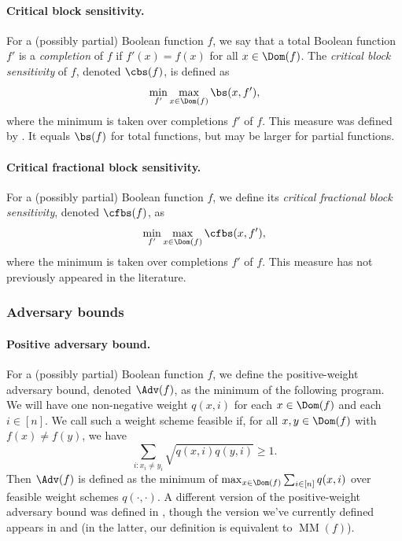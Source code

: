 \paragraph{Critical block sensitivity.}
For a (possibly partial) Boolean function $f$, we say that
a total Boolean function $f'$ is a \emph{completion} of $f$
if $f'(x)=f(x)$ for all $x\in\Dom(f)$. The \emph{critical block
sensitivity} of $f$, denoted $\cbs(f)$, is defined as
\[\min_{f'}\max_{x\in\Dom(f)}\bs(x,f'),\]
where the minimum is taken over completions $f'$ of $f$.
This measure was defined by \cite{HN12}. It equals $\bs(f)$
for total functions, but may be larger for partial functions.

\paragraph{Critical fractional block sensitivity.}
For a (possibly partial) Boolean function $f$, we define
its \emph{critical fractional block sensitivity}, denoted
$\cfbs(f)$, as
\[\min_{f'}\max_{x\in\Dom(f)}\cfbs(x,f'),\]
where the minimum is taken over completions $f'$ of $f$.
This measure has not previously appeared in the literature.

\subsubsection{Adversary bounds}
\label{sec:prelim_adv}

\paragraph{Positive adversary bound.}
For a (possibly partial) Boolean function $f$,
we define the positive-weight adversary bound,
denoted $\Adv(f)$, as the minimum of the following program.
We will have one non-negative weight $q(x,i)$
for each $x\in\Dom(f)$ and each $i\in[n]$. We call
such a weight scheme feasible if, for all
$x,y\in\Dom(f)$ with $f(x)\ne f(y)$,
we have
\[\sum_{i:x_i\ne y_i} \sqrt{q(x,i)q(y,i)}\ge 1.\]
Then $\Adv(f)$ is defined as the minimum
of $\max_{x\in\Dom(f)}\sum_{i\in[n]} q(x,i)$
over feasible weight schemes $q(\cdot,\cdot)$.
A different version of the positive-weight
adversary bound was defined in \cite{Amb02},
though the version we've currently defined
appears in \cite{LM08} and \cite{SS06}
(in the latter, our definition is equivalent
to $\operatorname{MM}(f)$).

